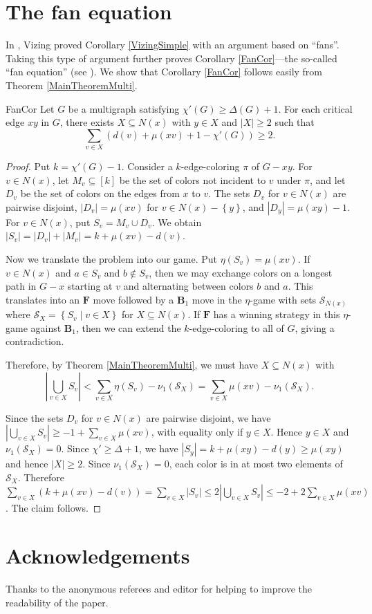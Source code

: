 \documentclass[12pt]{amsart}
\theoremstyle{plain}
\theoremstyle{definition}
\theoremstyle{remark}
\newcommand{\fancy}[1]{\mathcal{#1}}
\newcommand{\set}[1]{\left\{ #1 \right\}}
\newcommand{\setbs}[2]{\left\{ #1 \mid #2 \right\}}
\newcommand{\card}[1]{\left|#1\right|}
\newcommand{\irange}[1]{\left[#1\right]}
\newcommand{\parens}[1]{\left( #1 \right)}
\renewcommand{\S}{\fancy{S}}
\newcommand{\F}{\mathbf{F}}
\newcommand{\B}{\mathbf{B}}
\begin{document}
\section{The fan equation}\label{FanSection}
In \cite{vizing}, Vizing proved Corollary \ref{VizingSimple} with an argument based on ``fans''.  
Taking this type of argument further proves Corollary \ref{FanCor}---the so-called ``fan equation'' (see \cite{stiebitz}).  
We show that Corollary \ref{FanCor} follows easily from Theorem \ref{MainTheoremMulti}.

\begin{repcor}{FanCor}
Let $G$ be a multigraph satisfying $\chi'(G) \ge \Delta(G) + 1$. For each critical edge $xy$ in $G$, there exists $X \subseteq N(x)$ with $y \in X$ and $\card{X} \geq 2$ such that
\[\sum_{v \in X} \parens{d(v) + \mu(xv) + 1 - \chi'(G)} \geq 2. \]
\end{repcor}
\begin{proof}
Put $k = \chi'(G) - 1$.  Consider a $k$-edge-coloring $\pi$ of $G - xy$.  For $v \in N(x)$, let
$M_v \subseteq \irange{k}$ be the set of colors not incident to $v$ under $\pi$, and let $D_v$ be the set of colors on the edges from $x$ to $v$.  The sets $D_v$ for $v \in N(x)$ are
pairwise disjoint, $\card{D_v} = \mu(xv)$ for $v \in N(x) - \set{y}$, and
$\card{D_y} = \mu(xy) - 1$.  For $v \in N(x)$, put $S_v = M_v \cup
D_v$. We obtain $\card{S_v} = \card{D_v} + \card{M_v} = k + \mu(xv) - d(v)$.  

Now we translate the problem into our game.  Put $\eta(S_v) = \mu(xv)$. 
If $v \in N(x)$ and $a \in S_v$ and $b \not \in S_v$, then we may exchange colors on a longest path in $G-x$ starting at $v$ and alternating between colors $b$ and $a$. 
This translates into an $\F$ move followed by a $\B_1$ move in the $\eta$-game with sets
$\S_{N(x)}$ where $\S_X = \setbs{S_v}{v \in X}$ for $X \subseteq N(x)$. If $\F$ has a winning
strategy in this $\eta$-game against $\B_1$, then we can extend the $k$-edge-coloring to all of $G$, giving a contradiction.  

Therefore, by Theorem \ref{MainTheoremMulti}, we must have $X \subseteq N(x)$ with 
\[\card{\bigcup_{v \in X} S_v} < \sum_{v \in X} \eta(S_v) - \nu_1(\S_X) = \sum_{v \in X} \mu(xv) - \nu_1(\S_X).\]  

Since the sets $D_v$ for $v \in N(x)$ are pairwise disjoint, we have
$\card{\bigcup_{v \in X} S_v} \geq -1 + \sum_{v \in X} \mu(xv)$, with equality
only if $y \in X$.  Hence $y \in X$ and $\nu_1(\S_X) = 0$.  Since $\chi' \geq
\Delta + 1$, we have $\card{S_y} = k + \mu(xy) - d(y) \geq \mu(xy)$ and hence
$\card{X} \geq 2$.  Since $\nu_1(\S_X) = 0$, each color is in at most two
elements of $\S_X$.  Therefore $\sum_{v \in X} \parens{k + \mu(xv) - d(v)} =
\sum_{v \in X} \card{S_v} \leq 2 \card{\bigcup_{v \in X} S_v} \leq -2 + 2\sum_{v \in X} \mu(xv)$.  The claim follows.
\end{proof}

\section{Acknowledgements}
\noindent Thanks to the anonymous referees and editor for helping to improve the readability of the paper.



\end{document}

